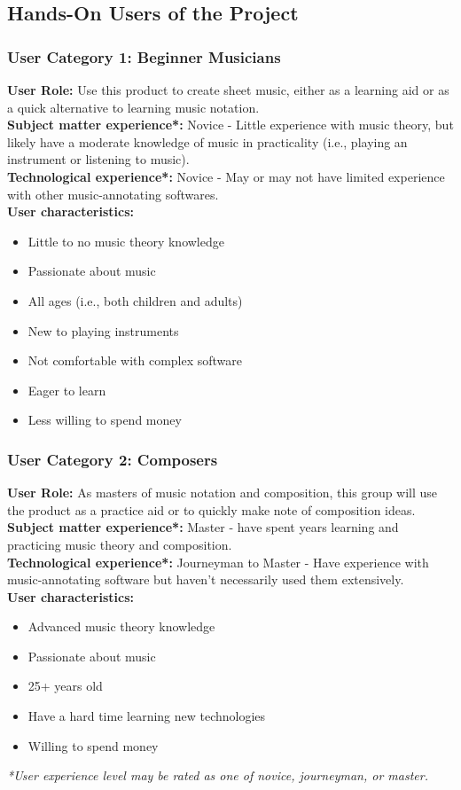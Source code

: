 \documentclass[12pt]{article}
\begin{document}
\subsection{Hands-On Users of the Project}
\subsubsection*{User Category 1: Beginner Musicians}
\textbf{User Role:} Use this product to create sheet music, either as a learning aid or as a quick alternative to learning music notation.\\
\textbf{Subject matter experience*:} Novice - Little experience with music theory, but likely have a moderate knowledge of music in practicality (i.e., playing an instrument or listening to music). \\
\textbf{Technological experience*:} Novice - May or may not have limited experience with other music-annotating softwares. \\
\textbf{User characteristics:} 
\begin{itemize}
  \item Little to no music theory knowledge
  \item Passionate about music
  \item All ages (i.e., both children and adults)
  \item New to playing instruments
  \item Not comfortable with complex software
  \item Eager to learn
  \item Less willing to spend money
\end{itemize}

\subsubsection*{User Category 2: Composers}
\textbf{User Role:} As masters of music notation and composition, this group will use the product as a practice aid or to quickly make note of composition ideas. \\
\textbf{Subject matter experience*:} Master - have spent years learning and practicing music theory and composition. \\
\textbf{Technological experience*:} Journeyman to Master - Have experience with music-annotating software but haven't necessarily used them extensively. \\
\textbf{User characteristics:}
\begin{itemize}
  \item Advanced music theory knowledge
  \item Passionate about music
  \item 25+ years old
  \item Have a hard time learning new technologies
  \item Willing to spend money
\end{itemize}
\noindent
\textit{*User experience level may be rated as one of novice, journeyman, or master.}
\end{document}
